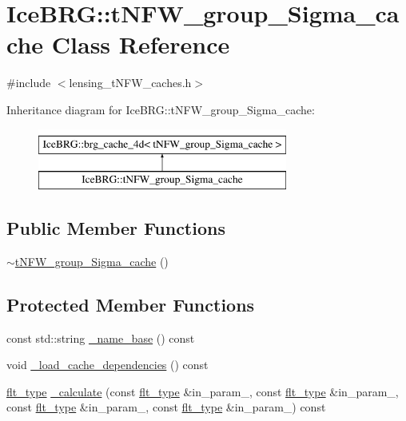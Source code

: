 \hypertarget{classIceBRG_1_1tNFW__group__Sigma__cache}{}\section{Ice\+B\+R\+G\+:\+:t\+N\+F\+W\+\_\+group\+\_\+\+Sigma\+\_\+cache Class Reference}
\label{classIceBRG_1_1tNFW__group__Sigma__cache}


{\ttfamily \#include $<$lensing\+\_\+t\+N\+F\+W\+\_\+caches.\+h$>$}

Inheritance diagram for Ice\+B\+R\+G\+:\+:t\+N\+F\+W\+\_\+group\+\_\+\+Sigma\+\_\+cache\+:\begin{figure}[H]
\begin{center}
\leavevmode
\includegraphics[height=2.000000cm]{classIceBRG_1_1tNFW__group__Sigma__cache}
\end{center}
\end{figure}
\subsection*{Public Member Functions}
\begin{DoxyCompactItemize}
\item 
\hyperlink{classIceBRG_1_1tNFW__group__Sigma__cache_ac366180ba50597dcfb66e68c75106c10}{$\sim$t\+N\+F\+W\+\_\+group\+\_\+\+Sigma\+\_\+cache} ()
\end{DoxyCompactItemize}
\subsection*{Protected Member Functions}
\begin{DoxyCompactItemize}
\item 
const std\+::string \hyperlink{classIceBRG_1_1tNFW__group__Sigma__cache_a282f8dad6e50f4e532c93f6752fddd93}{\+\_\+name\+\_\+base} () const 
\item 
void \hyperlink{classIceBRG_1_1tNFW__group__Sigma__cache_af9d40651218d6a373ceb870610b82cca}{\+\_\+load\+\_\+cache\+\_\+dependencies} () const 
\item 
\hyperlink{lib_2IceBRG__main_2common_8h_ad0f130a56eeb944d9ef2692ee881ecc4}{flt\+\_\+type} \hyperlink{classIceBRG_1_1tNFW__group__Sigma__cache_af7f054cc977c9ef587561f7a5a6ad539}{\+\_\+calculate} (const \hyperlink{lib_2IceBRG__main_2common_8h_ad0f130a56eeb944d9ef2692ee881ecc4}{flt\+\_\+type} \&in\+\_\+param\+\_, const \hyperlink{lib_2IceBRG__main_2common_8h_ad0f130a56eeb944d9ef2692ee881ecc4}{flt\+\_\+type} \&in\+\_\+param\+\_, const \hyperlink{lib_2IceBRG__main_2common_8h_ad0f130a56eeb944d9ef2692ee881ecc4}{flt\+\_\+type} \&in\+\_\+param\+\_, const \hyperlink{lib_2IceBRG__main_2common_8h_ad0f130a56eeb944d9ef2692ee881ecc4}{flt\+\_\+type} \&in\+\_\+param\+\_) const 
\end{DoxyCompactItemize}

